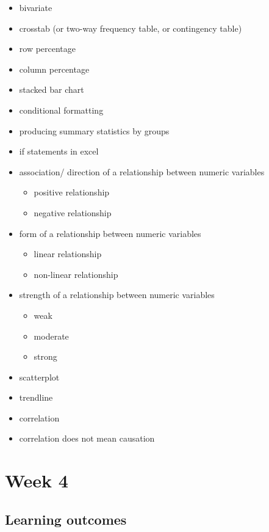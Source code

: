 \documentclass[
]{book}
\providecommand{\tightlist}{%
  \setlength{\itemsep}{0pt}\setlength{\parskip}{0pt}}
\begin{document}
\begin{itemize}
\tightlist
\item
  bivariate
\item
  crosstab (or two-way frequency table, or contingency table)
\item
  row percentage
\item
  column percentage
\item
  stacked bar chart
\item
  conditional formatting
\item
  producing summary statistics by groups
\item
  if statements in excel
\item
  association/ direction of a relationship between numeric variables

  \begin{itemize}
  \tightlist
  \item
    positive relationship
  \item
    negative relationship
  \end{itemize}
\item
  form of a relationship between numeric variables

  \begin{itemize}
  \tightlist
  \item
    linear relationship
  \item
    non-linear relationship
  \end{itemize}
\item
  strength of a relationship between numeric variables

  \begin{itemize}
  \tightlist
  \item
    weak
  \item
    moderate
  \item
    strong
  \end{itemize}
\item
  scatterplot
\item
  trendline
\item
  correlation
\item
  correlation does not mean causation
\end{itemize}

\hypertarget{week4}{%
\chapter{Week 4}\label{week4}}

\hypertarget{learning-outcomes-3}{%
\section{Learning outcomes}\label{learning-outcomes-3}}
\end{document}

